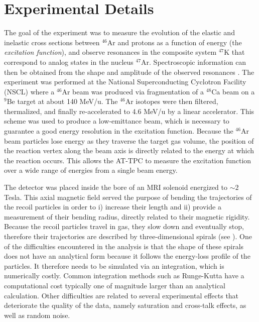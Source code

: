 \documentclass[review,sort&compress]{elsarticle}
\begin{document}
\section{Experimental Details} 
\label{Sec:Exp}
The goal of the experiment was to measure the evolution of the elastic and inelastic cross sections between $^{46}$Ar and protons as a function of energy (the {\em excitation function}), and observe resonances in the composite system $^{47}$K that correspond to analog states in the nucleus $^{47}$Ar. Spectroscopic information can then be obtained from the shape and amplitude of the observed resonances \cite{Bradt2018}. 
The experiment was performed at the National Superconducting Cyclotron Facility (NSCL) where a $^{46}$Ar beam was produced via fragmentation of a $^{48}$Ca beam on a $^9$Be target at about 140 MeV/u. The $^{46}$Ar isotopes were then filtered, thermalized, and finally re-accelerated to 4.6 MeV/u by a linear accelerator. This scheme was used to produce a low-emittance beam, which is necessary to guarantee a good energy resolution in the excitation function. Because the  $^{46}$Ar beam particles lose energy as they traverse the target gas volume, the position of the reaction vertex along the beam axis is directly related to the energy at which the reaction occurs. This allows the AT-TPC to measure the excitation function over a wide range of energies from a single beam energy.

The detector was placed inside the bore of an MRI solenoid energized to $\sim 2$ Tesla. This axial magnetic field served the purpose of bending the trajectories of the recoil particles in order to i) increase their length and ii) provide a measurement of their bending radius, directly related to their magnetic rigidity. Because the recoil particles travel in gas, they slow down and eventually stop, therefore their trajectories are described by three-dimensional spirals (see \cite{Bradt2017}). One of the difficulties encountered in the analysis is that the shape of these spirals does not have an analytical form because it follows the energy-loss profile of the particles. It therefore needs to be simulated via an integration, which is numerically costly. Common integration methods such as Runge-Kutta have a computational cost typically one of magnitude larger than an analytical calculation. Other difficulties are related to several experimental effects that deteriorate the quality of the data, namely saturation and cross-talk effects, as well as random noise. 
\end{document}
